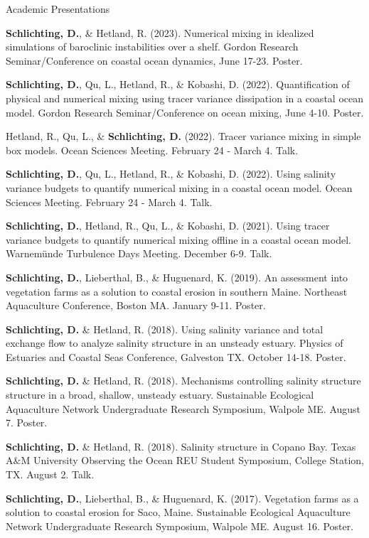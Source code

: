 \documentclass{resume} %
\begin{document}
\begin{rSection}{Academic Presentations} \itemsep -3pt
\begin{etaremune}
    \item \textbf{Schlichting, D.}, \& Hetland, R. (2023). Numerical mixing in idealized simulations of baroclinic instabilities over a shelf. Gordon Research Seminar/Conference on coastal ocean dynamics, June 17-23. Poster.
    \item \textbf{Schlichting, D.}, Qu, L., Hetland, R., \& Kobashi, D. (2022). Quantification of physical and numerical mixing using tracer variance dissipation in a coastal ocean model. Gordon Research Seminar/Conference on ocean mixing, June 4-10. Poster.
    \item Hetland, R., Qu, L., \& \textbf{Schlichting, D.} (2022). Tracer variance mixing in simple box models. Ocean Sciences Meeting. February 24 - March 4. Talk.
    \item \textbf{Schlichting, D.}, Qu, L., Hetland, R., \& Kobashi, D. (2022). Using salinity variance budgets to quantify numerical mixing in a coastal ocean model. Ocean Sciences Meeting. February 24 - March 4. Talk. 
    \item \textbf{Schlichting, D.}, Hetland, R., Qu, L., \& Kobashi, D. (2021). Using tracer variance budgets to quantify numerical mixing offline in a coastal ocean model. Warnem\"{u}nde Turbulence Days Meeting. December 6-9. Talk. 
    \item \textbf{Schlichting, D.}, Lieberthal, B., \& Huguenard, K. (2019). An assessment into vegetation farms as a solution to coastal erosion in southern Maine. Northeast Aquaculture Conference, Boston MA. January 9-11. Poster.
    \item \textbf{Schlichting, D.} \& Hetland, R. (2018). Using salinity variance and total exchange flow to analyze salinity structure in an unsteady estuary. Physics of Estuaries and Coastal Seas Conference, Galveston TX. October 14-18. Poster.
    \item \textbf{Schlichting, D.} \& Hetland, R. (2018). Mechanisms controlling salinity structure structure in a broad, shallow, unsteady estuary. Sustainable Ecological Aquaculture Network Undergraduate Research Symposium, Walpole ME. August 7. Poster.
    \item \textbf{Schlichting, D.} \& Hetland, R. (2018). Salinity structure in Copano Bay. Texas A$\&$M University Observing the Ocean REU Student Symposium, College Station, TX. August 2. Talk.
    \item \textbf{Schlichting, D.}, Lieberthal, B., \& Huguenard, K. (2017). Vegetation farms as a solution to coastal erosion for Saco, Maine. Sustainable Ecological Aquaculture Network Undergraduate Research Symposium, Walpole ME. August 16. Poster.
\end{etaremune}
\end{rSection}
\end{document}
